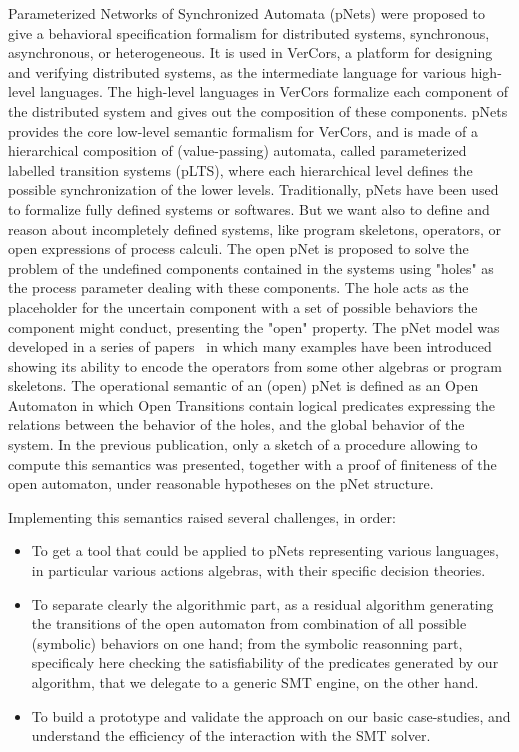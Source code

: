 \documentclass{lncs/llncs}
\begin{document}
Parameterized Networks of Synchronized Automata (pNets) were proposed
to give a behavioral specification formalism for distributed
systems, synchronous, asynchronous, or heterogeneous. It is used in
VerCors, a platform for designing and 
verifying distributed systems, as the intermediate language for various
high-level languages. The high-level languages in VerCors formalize
each component of the 
distributed system and gives out the composition of these
components.
pNets provides the core low-level semantic formalism for VerCors, and
is made of a hierarchical composition of (value-passing) automata,
called parameterized labelled transition systems (pLTS), where each
hierarchical level defines the possible synchronization of the lower levels.
Traditionally, pNets have been used to formalize fully
defined systems or softwares. But we want also to define and reason
about incompletely defined systems, like program skeletons, operators,
or open expressions of process calculi.
The open pNet is proposed to solve the
problem of the undefined components contained in the systems using
"holes" as the process parameter dealing with these components. The
hole acts as the placeholder for the uncertain component with a set of
possible behaviors the component might conduct, presenting the "open"
property.  
The pNet model was developed in a series of
papers~\cite{HMZ:PDP15,henrio:Forte2016} in which many examples have been
introduced showing its ability to encode the operators from some
other algebras or  program skeletons.
The operational semantic of an (open) pNet is defined as an
Open Automaton in which Open Transitions contain logical predicates
expressing the relations between the behavior of the holes, and the
global behavior of the system. In the previous publication,
only a sketch of a procedure allowing to compute this semantics was
presented, together with a proof of finiteness of the open automaton, under
reasonable hypotheses on the pNet structure.

Implementing this semantics raised several challenges, in order:
\begin{itemize}
  \item To get a tool that could be applied to pNets representing
    various languages, in particular various actions algebras,
    with their specific decision theories.
  \item To separate clearly the algorithmic part, as a residual
      algorithm generating the transitions of the open automaton from
      combination of all possible (symbolic) behaviors on one hand; from the
      symbolic reasonning part, specificaly here checking the
      satisfiability of the predicates generated by our algorithm,
      that we delegate to a generic SMT engine, on the other hand.
  \item To build a prototype and validate the approach on our basic
    case-studies, and understand the efficiency of the interaction
    with the SMT solver.
\end{itemize}
\end{document}
